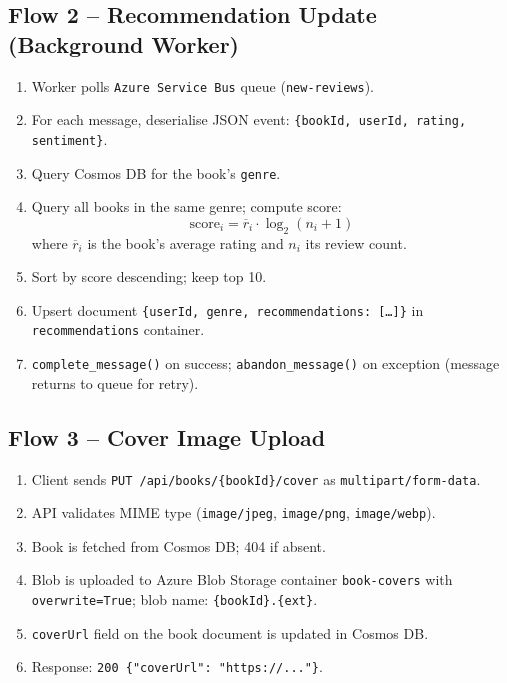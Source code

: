 \documentclass[12pt, a4paper]{report}
\begin{document}
\subsection{Flow 2 – Recommendation Update (Background Worker)}

\begin{enumerate}[nosep]
  \item Worker polls \texttt{Azure Service Bus} queue (\texttt{new-reviews}).
  \item For each message, deserialise JSON event: \texttt{\{bookId, userId, rating, sentiment\}}.
  \item Query Cosmos DB for the book's \texttt{genre}.
  \item Query all books in the same genre; compute score:
    \[
      \text{score}_i = \overline{r}_i \cdot \log_2\!\left(n_i + 1\right)
    \]
    where $\overline{r}_i$ is the book's average rating and $n_i$ its review count.
  \item Sort by score descending; keep top 10.
  \item Upsert document \texttt{\{userId, genre, recommendations: [\ldots]\}} in
    \texttt{recommendations} container.
  \item \texttt{complete\_message()} on success; \texttt{abandon\_message()} on exception
    (message returns to queue for retry).
\end{enumerate}

\subsection{Flow 3 – Cover Image Upload}

\begin{enumerate}[nosep]
  \item Client sends \texttt{PUT /api/books/\{bookId\}/cover} as \texttt{multipart/form-data}.
  \item API validates MIME type (\texttt{image/jpeg}, \texttt{image/png}, \texttt{image/webp}).
  \item Book is fetched from Cosmos DB; 404 if absent.
  \item Blob is uploaded to Azure Blob Storage container \texttt{book-covers} with
    \texttt{overwrite=True}; blob name: \texttt{\{bookId\}.\{ext\}}.
  \item \texttt{coverUrl} field on the book document is updated in Cosmos DB.
  \item Response: \texttt{200 \{"coverUrl": "https://..."\}}.
\end{enumerate}
\end{document}
